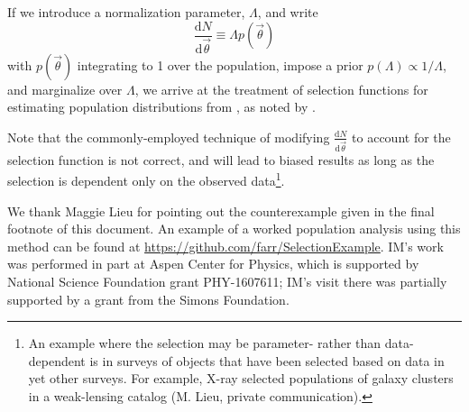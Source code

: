 \documentclass[modern]{aastex62}
\newcommand{\dd}{\mathrm{d}}
\newcommand{\diff}[2]{\frac{\dd #1}{\dd #2}}
\newcommand{\vtheta}{\vec{\theta}}
\begin{document}
If we introduce a normalization parameter, $\Lambda$, and write
%
\begin{equation}
  \diff{N}{\vtheta} \equiv \Lambda p\left( \vtheta \right)
\end{equation}
%
with $p\left( \vtheta \right)$ integrating to 1 over the population, impose a
prior $p\left( \Lambda \right)\propto 1/\Lambda$, and marginalize over
$\Lambda$, we arrive at the treatment of selection functions for estimating
population distributions from \citet{Loredo2004,O1-BBH,Mandel2016}, as noted by
\citet{Fishbach2018}.

Note that the commonly-employed technique of modifying $\diff{N}{\vtheta}$ to
account for the selection function is not correct, and will lead to biased
results as long as the selection is dependent only on the observed
data\footnote{An example where the selection may be parameter- rather than
data-dependent is in surveys of objects that have been selected based on data in
yet other surveys.  For example, X-ray selected populations of galaxy clusters
in a weak-lensing catalog (M. Lieu, private communication).}.

\acknowledgments

We thank Maggie Lieu for pointing out the counterexample given in the final
footnote of this document.  An example of a worked population analysis using
this method can be found at \url{https://github.com/farr/SelectionExample}.
IM's work was performed in part at Aspen Center for Physics, which is supported
by National Science Foundation grant PHY-1607611; IM's visit there was partially
supported by a grant from the Simons Foundation.

\newpage


\end{document}
